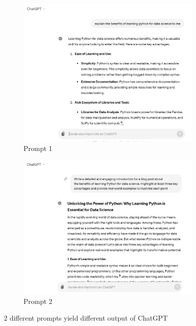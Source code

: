 \documentclass[runningheads]{llncs}
\begin{document}
\begin{figure}[htbp]
  \centering
  \begin{subfigure}[b]{0.48\textwidth}
      \centering
      \includegraphics[width=\textwidth]{prompt_ds_1.PNG}
      \caption{Prompt 1}
      \label{fig:prompt1}
  \end{subfigure}
  \hfill
  \begin{subfigure}[b]{0.48\textwidth}
      \centering
      \includegraphics[width=\textwidth]{prompt_ds_2.PNG}
      \caption{Prompt 2}
      \label{fig:prompt2}
  \end{subfigure}
  \caption{2 different prompts yield different output of ChatGPT}
  \label{fig:both_prompts}
\end{figure}
\end{document}
